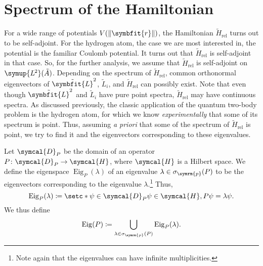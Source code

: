 \documentclass[12pt, a4 paper]{article}
\theoremstyle{definition}
\newcommand{\ltwo}{\symup{L\kern-0.5pt^2}}
\newcommand{\cc}{\symbb{C}}
\newcommand{\nn}{\symbb{N}_0}
\newcommand{\hilbert}{\symcal{H}}
\newcommand{\domain}{\symcal{D}}
\newcommand{\spec}{\sigma}
\newcommand{\rvec}{\symbfit{r}}
\newcommand{\lvecsquare}{\tilde{\symbfit{L}}^2}
\DeclareMathOperator{\spann}{span}
\newcommand{\hrel}{\tilde{H}_\text{rel}}
\newcommand{\eigen}{\operatorname{Eig}}
\newcommand{\ltwoa}{\ltwo(\tilde{A})}
\DeclarePairedDelimiter{\norm}{\lVert}{\rVert}
\begin{document}
    \section{Spectrum of the Hamiltonian}

    For a wide range of potentials \(V(\norm{\rvec})\), the Hamiltonian \(\hrel\) turns out to be self-adjoint. For the hydrogen atom, the case we are most interested in, the potential is the familiar Coulomb potential. It turns out that \(\hrel\) is self-adjoint in that case. So, for the further analysis, we assume that \(\hrel\) is self-adjoint on \(\ltwoa\). Depending on the spectrum of \(\hrel\), common orthonormal eigenvectors of \(\lvecsquare\), \(\tilde{L}_i\), and \(\hrel\) can possibly exist. Note that even though \(\lvecsquare\) and \(\tilde{L}_i\) have pure point spectra, \(\hrel\) may have continuous spectra. As discussed previously, the classic application of the quantum two-body problem is the hydrogen atom, for which we know \textit{experimentally} that some of its spectrum is point. Thus, assuming \textit{a priori} that some of the spectrum of \(\hrel\) is point, we try to find it and the eigenvectors corresponding to these eigenvalues.

    Let \(\domain_P\) be the domain of an operator \(P \colon \domain_P \rightarrow \hilbert\), where \(\hilbert\) is a Hilbert space. We define the eigenspace \(\eigen_P(\lambda)\) of an eigenvalue \(\lambda \in \spec_{\symrm{p}}(P)\) to be the eigenvectors corresponding to the eigenvalue \(\lambda\).\footnote{Note again that the eigenvalues can have infinite multiplicities.} Thus,
    \[
        \eigen_P(\lambda) \coloneq \setc*{\psi \in \domain_P}{\psi \in \hilbert, P\psi = \lambda\psi}.
    \]
    We thus define
    \[
        \eigen(P) \coloneq \bigcup_{\lambda \in \spec_{\symrm{p}}(P)} \eigen_P(\lambda).
    \]
\end{document}
